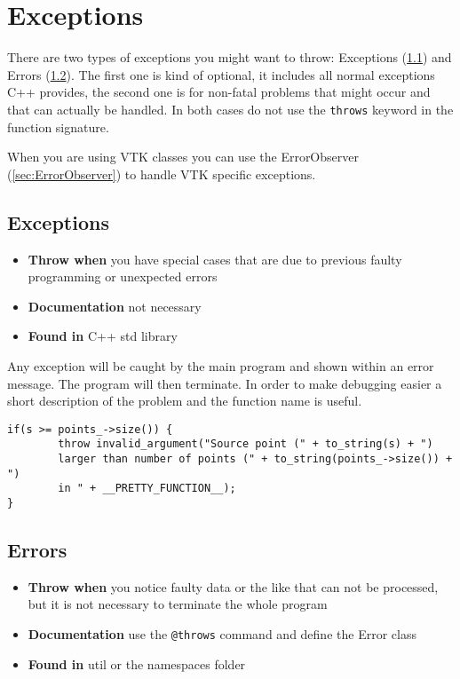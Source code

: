 
\chapter{Exceptions}

There are two types of exceptions you might want to throw: Exceptions (\ref{sec:Exceptions}) and Errors (\ref{sec:Errors}). The first one is kind of optional, it includes all normal exceptions C++ provides, the second one is for non-fatal problems that might occur and that can actually be handled. In both cases do not use the \texttt{throws} keyword in the function signature.

When you are using VTK classes you can use the ErrorObserver (\ref{sec:ErrorObserver}) to handle VTK specific exceptions.

\section{Exceptions}
\label{sec:Exceptions}

\begin{itemize}
	\item \textbf{Throw when} you have special cases that are due to previous faulty programming or unexpected errors
	\item \textbf{Documentation} not necessary
	\item \textbf{Found in} C++ std library
\end{itemize}

Any exception will be caught by the main program and shown within an error message. The program will then terminate. In order to make debugging easier a short description of the problem and the function name is useful.

\begin{lstlisting}[style=lstStyleCpp]
if(s >= points_->size()) {
        throw invalid_argument("Source point (" + to_string(s) + ") 
        larger than number of points (" + to_string(points_->size()) + ") 
        in " + __PRETTY_FUNCTION__);
}
\end{lstlisting}


\section{Errors}
\label{sec:Errors}

\begin{itemize}
	\item \textbf{Throw when} you notice faulty data or the like that can not be processed, but it is not necessary to terminate the whole program
	\item \textbf{Documentation} use the \texttt{@throws} command and define the Error class 
	\item \textbf{Found in} util or the namespaces folder
\end{itemize}

